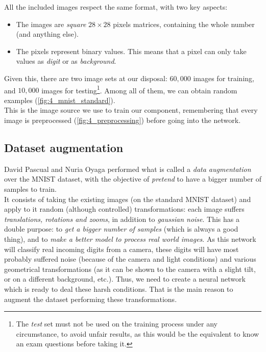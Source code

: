 			All the included images respect the same format, with two key aspects:
			\begin{itemize}
				\item The images are \emph{square} $28 \times 28$ pixels matrices, containing the whole number (and anything else).
				
				\item The pixels represent binary values. This means that a pixel can only take values as \emph{digit} or as \emph{background}.
			\end{itemize}
			
			Given this, there are two image sets at our disposal: $60,000$ images for training, and $10,000$ images for testing\footnote{The \emph{test} set must not be used on the training process under any circumstance, to avoid unfair results, as this would be the equivalent to know an exam questions before taking it.}. Among all of them, we can obtain random examples (\autoref{fig:4_mnist_standard}).\\
			
			This is the image source we use to train our component, remembering that every image is preprocessed (\autoref{fig:4_preprocessing}) before going into the network.\\
			

		\subsection{Dataset augmentation}
			David Pascual \cite{dpascualhe} and Nuria Oyaga \cite{noyaga} performed what is called a \emph{data augmentation} over the MNIST dataset, with the objective of \emph{pretend} to have a bigger number of samples to train.\\
			
			It consists of taking the existing images (on the standard MNIST dataset) and apply to it random (although controlled) transformations: each image suffers \emph{translations, rotations and zooms}, in addition to \emph{gaussian noise}. This has a double purpose: to \emph{get a bigger number of samples} (which is always a good thing), and to \emph{make a better model to process real world images}. As this network will classify real incoming digits from a camera, these digits will have most probably suffered noise (because of the camera and light conditions) and various geometrical transformations (as it can be shown to the camera with a slight tilt, or on a different background, etc.). Thus, we need to create a neural network which is ready to deal these harsh conditions. That is the main reason to augment the dataset performing these transformations.\\
			
